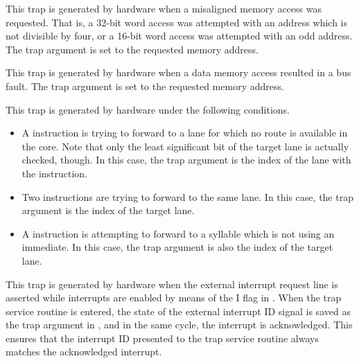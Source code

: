 This trap is generated by hardware when a misaligned memory access was
requested. That is, a 32-bit word access was attempted with an address which is
not divisible by four, or a 16-bit word access was attempted with an odd
address. The trap argument is set to the requested memory address.



This trap is generated by hardware when a data memory access resulted in a bus
fault. The trap argument is set to the requested memory address.



This trap is generated by hardware under the following conditions.

\begin{itemize}

\item A  instruction is trying to forward to a lane for which no
route is available in the core. Note that only the least significant bit of the
target lane is actually checked, though. In this case, the trap argument is the
index of the lane with the  instruction.

\item Two  instructions are trying to forward to the same lane. In
this case, the trap argument is the index of the target lane.

\item A  instruction is attempting to forward to a syllable which
is not using an immediate. In this case, the trap argument is also the index of
the target lane.

\end{itemize}


\interrupt{}

This trap is generated by hardware when the external interrupt request line is
asserted while interrupts are enabled by means of the I flag in . When
the trap service routine is entered, the state of the external interrupt ID
signal is saved as the trap argument in , and in the same cycle, the
interrupt is acknowledged. This ensures that the interrupt ID presented to the
trap service routine always matches the acknowledged interrupt.

